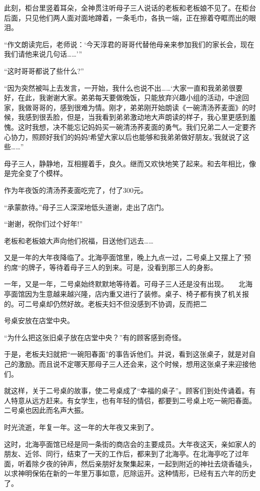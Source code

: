 \documentclass[UTF8,a4paper,8pt]{ctexart}
\begin{document}
 此刻，柜台里竖着耳朵，全神贯注听母子三人说话的老板和老板娘不见了。在柜台后面，只见他们两人面对面地蹲着，一条毛巾，各执一端，正在擦着夺眶而出的眼泪。
 
 “作文朗读完后，老师说：‘今天淳君的哥哥代替他母亲来参加我们的家长会，现在我们请他来说几句话……’”
 
 “这时哥哥都说了些什么?”
 
 “因为突然被叫上去发言，一开始，我什么也说不出……‘大家一直和我弟弟很要好，在此，我谢谢大家。弟弟每天要做晚饭，只能放弃兴趣小组的活动，中途回家，我做哥哥的，感到很难为情。刚才，弟弟刚开始朗读《一碗清汤荞麦面》的时候，我感到很丢脸，但是，当我看到弟弟激动地大声朗读的样子，我心里更感到羞愧。这时我想，决不能忘记妈妈买一碗清汤荞麦面的勇气。我们兄弟二人一定要齐心协力，照顾好我们的妈妈!希望大家以后也能够和我弟弟做好朋友。’我就说了这些……”
 
 母子三人，静静地，互相握着手，良久。继而又欢快地笑了起来。和去年相比，像是完全变了个模样。
 
 作为年夜饭的清汤荞麦面吃完了，付了300元。
 
 “承蒙款待。”母子三人深深地低头道谢，走出了店门。
 
 “谢谢，祝你们过个好年!”
 
 老板和老板娘大声向他们祝福，目送他们远去……
 
 又是一年的大年夜降临了。北海亭面馆里，晚上九点一过，二号桌上又摆上了’预约席“的牌子，等待着母子三人的到来。可是，没看到那三人的身影。
 
 一年，又是一年，二号桌始终默默地等待着。可母子三人还是没有出现。　　北海亭面馆因为生意越来越兴隆，店内重又进行了装修。桌子、椅子都有换了机关报的。可二号桌却仍然好故。老板夫妇不但没感到不协调，反而把二
 
 号桌安放在店堂中央。
 
 “为什么把这张旧桌子放在店堂中央？”有的顾客感到奇怪。
 
 于是，老板夫妇就把“一碗阳春面”的事告诉他们。并说，看到这张桌子，就是对自己的激励。而且说不定哪天那母子三人还会来，这个时候，想用这张桌子来迎接他们。
 
 就这样，关于二号桌的故事，使二号桌成了“幸福的桌子”。顾客们到处传诵着。有人特意从远方赶来。有女学生，也有年轻的情侣，都要到二号桌上吃一碗阳春面。二号桌也因此而名声大振。
 
 
 
 时光流逝，年复一年。这一年的大年夜又来到了。
 
 这时，北海亭面馆已经是同一条街的商店会的主要成员。大年夜这天，亲如家人的朋友、近邻、同行，结束了一天的工作后，都来到了北海亭。在北海亭吃了过年面，听着除夕夜的钟声，然后亲朋好友聚集起来，一起到附近的神社去烧香磕头，以求神明保佑在新的一年里万事如意，厄除运开。这种情形，已经有五六年的历史了。
 
\end{document}
